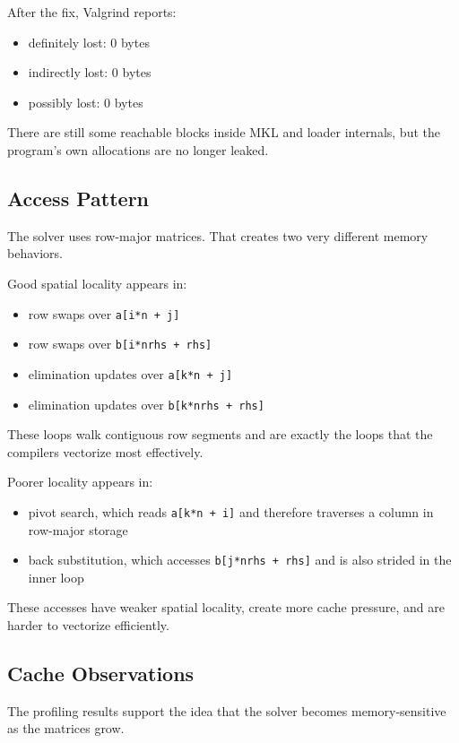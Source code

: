 \documentclass[11pt,a4paper]{article}
\begin{document}
After the fix, Valgrind reports:

\begin{itemize}
\item definitely lost: 0 bytes
\item indirectly lost: 0 bytes
\item possibly lost: 0 bytes
\end{itemize}

There are still some reachable blocks inside MKL and loader internals, but the
program's own allocations are no longer leaked.

\subsection{Access Pattern}

The solver uses row-major matrices. That creates two very different memory
behaviors.

Good spatial locality appears in:

\begin{itemize}
\item row swaps over \texttt{a[i*n + j]}
\item row swaps over \texttt{b[i*nrhs + rhs]}
\item elimination updates over \texttt{a[k*n + j]}
\item elimination updates over \texttt{b[k*nrhs + rhs]}
\end{itemize}

These loops walk contiguous row segments and are exactly the loops that the
compilers vectorize most effectively.

Poorer locality appears in:

\begin{itemize}
\item pivot search, which reads \texttt{a[k*n + i]} and therefore traverses a column in row-major storage
\item back substitution, which accesses \texttt{b[j*nrhs + rhs]} and is also strided in the inner loop
\end{itemize}

These accesses have weaker spatial locality, create more cache pressure, and
are harder to vectorize efficiently.

\subsection{Cache Observations}

The profiling results support the idea that the solver becomes memory-sensitive
as the matrices grow.
\end{document}
